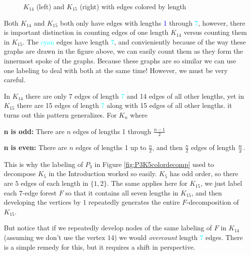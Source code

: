 \begin{figure}[H]
\begin{center}
\begin{tikzpicture}[scale=2]
            
    \end{tikzpicture}
    \end{center}
\caption{$K_{14}$ (left) and $K_{15}$ (right) with edges colored by length}
\label{fig:K14K15colored}
\end{figure}

Both $K_{14}$ and $K_{15}$ both only have edges with lengths \textcolor{blue}{1} through \textcolor{cyan}{7}, however, there is important distinction in counting edges of one length $K_{14}$ versus counting them in $K_{15}$. The \textcolor{cyan}{cyan} edges have length \textcolor{cyan}{7}, and convieniently because of the way these graphs are drawn in the figure above, we can easily count them as they form the innermost spoke of the graphs. Because these graphs are so similar we can use one labeling to deal with both at the same time! However, we must be very careful.

In $K_{14}$ there are only 7 edges of length \textcolor{cyan}{7} and 14 edges of all other lengths, yet in $K_{15}$ there are 15 edges of length \textcolor{cyan}{7} along with 15 edges of all other lengths. it turns out this pattern generalizes. For $K_{n}$ where\newline

\textbf{n is odd:} There are $n$ edges of lengths 1 through $\frac{n-1}{2}$

\textbf{n is even:} There are $n$ edges of lengths 1 up to $\frac{n}{2}$, and then $\frac{n}{2}$ edges of length $\frac{n}{2}\newline$.

This is why the labeling of $P_{3}$ in Figure \ref{fig:P3K5colordecomp} used to decompose $K_{5}$ in the Introduction worked so easily. $K_{5}$ has odd order, so there are $5$ edges of each length in $\{1,2\}$. The same applies here for $K_{15}$, we just label each $7$-edge forest $F$ so that it contains all seven lengths in $K_{15}$, and then developing the vertices by $1$ repeatedly generates the entire $F$-decomposition of $K_{15}$. 

But notice that if we repeatedly develop nodes of the same labeling of $F$ in $K_{14}$ (assuming we don't use the vertex $14$) we would \textit{overcount} length \textcolor{cyan}{7} edges. There is a simple remedy for this, but it requires a shift in perspective.

